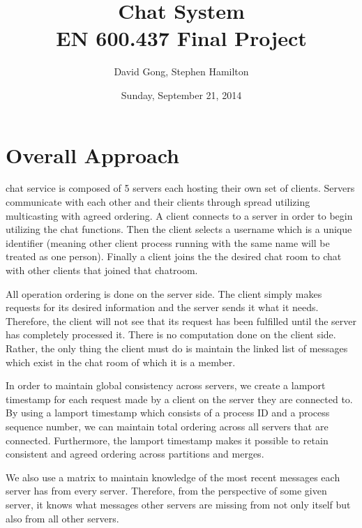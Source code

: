 \documentclass[12pt,journal,compsoc]{IEEEtran}
\begin{document}
\title{Chat System\\EN 600.437 Final Project}
\author{David Gong, Stephen Hamilton}%
\date{Sunday, September 21, 2014}
\maketitle
\section{Overall Approach}
 chat service is composed of 5 servers each hosting their own set of clients. Servers communicate with each other and their clients through spread utilizing multicasting with agreed ordering. A client connects to a  server in order to begin utilizing the chat functions. Then the client selects a username which is a unique identifier (meaning other client process running with the same name will be treated as one person). Finally a client joins the the desired chat room to chat with other clients that joined that chatroom.

All operation ordering is done on the server side. The client simply makes requests for its desired information and the server sends it what it needs. Therefore, the client will not see that its request has been fulfilled until the server has completely processed it. There is no computation done on the client side. Rather, the only thing the client must do is maintain the linked list of messages which exist in the chat room of which it is a member.

In order to maintain global consistency across servers, we create a lamport timestamp for each request made by a client on the server they are connected to. By using a lamport timestamp which consists of a process ID and a process sequence number, we can maintain total ordering across all servers that are connected. Furthermore, the lamport timestamp makes it possible to retain consistent and agreed ordering across partitions and merges.

We also use a matrix to maintain knowledge of the most recent messages each server has from every server. Therefore, from the perspective of some given server, it knows what messages other servers are missing from not only itself but also from all other servers.
\end{document}

